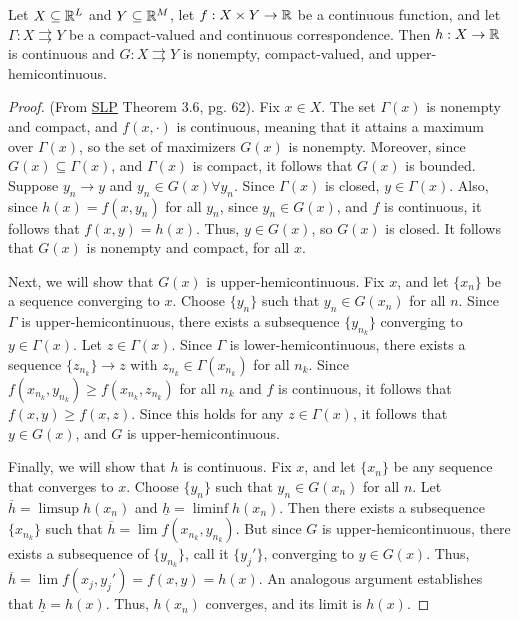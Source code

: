 \documentclass[10pt]{article}
\begin{document}
\begin{theorem}\label{thm:berge_max}
	 Let $X \subseteq \mathbb{R}^L$ and $Y \subseteq \mathbb{R}^M$, let $f: X \times Y \to \mathbb{R}$ be a continuous function, and let $\Gamma: X \rightrightarrows Y$ be a compact-valued and continuous correspondence. Then $h: X \to \mathbb{R}$ is continuous and $G: X \rightrightarrows Y$ is nonempty, compact-valued, and upper-hemicontinuous.
\end{theorem}
\begin{proof}
	(From \href{https://www.hup.harvard.edu/books/9780674750968}{SLP} Theorem 3.6, pg. 62). Fix $x \in X$. The set $\Gamma(x)$ is nonempty and compact, and $f(x,\cdot)$ is continuous, meaning that it attains a maximum over $\Gamma(x)$, so the set of maximizers $G(x)$ is nonempty. Moreover, since $G(x) \subseteq \Gamma(x)$, and $\Gamma(x)$ is compact, it follows that $G(x)$ is bounded. Suppose $y_n \to y$ and $y_n \in G(x) \forall y_n$. Since $\Gamma(x)$ is closed, $y \in \Gamma(x)$. Also, since $h(x) = f(x,y_n)$ for all $y_n$, since $y_n \in G(x)$, and $f$ is continuous, it follows that $f(x,y) = h(x)$. Thus, $y \in G(x)$, so $G(x)$ is closed. It follows that $G(x)$ is nonempty and compact, for all $x$.
	
	Next, we will show that $G(x)$ is upper-hemicontinuous. Fix $x$, and let $\{x_n\}$ be a sequence converging to $x$. Choose $\{y_n\}$ such that $y_n \in G(x_n)$ for all $n$. Since $\Gamma$ is upper-hemicontinuous, there exists a subsequence $\{y_{n_k}\}$ converging to $y \in \Gamma(x)$. Let $z \in \Gamma(x)$. Since $\Gamma$ is lower-hemicontinuous, there exists a sequence $\{z_{n_k}\} \to z$ with $z_{n_k} \in \Gamma(x_{n_k})$ for all $n_k$. Since $f(x_{n_k},y_{n_k}) \ge f(x_{n_k},z_{n_k})$ for all $n_k$ and $f$ is continuous, it follows that $f(x,y) \ge f(x,z)$. Since this holds for any $z \in \Gamma(x)$, it follows that $y \in G(x)$, and $G$ is upper-hemicontinuous.
	
	Finally, we will show that $h$ is continuous. Fix $x$, and let $\{x_n\}$ be any sequence that converges to $x$. Choose $\{y_n\}$ such that $y_n \in G(x_n)$ for all $n$. Let $\overline{h} = \limsup h(x_n)$ and $\underline{h} = \liminf h(x_n)$. Then there exists a subsequence $\{x_{n_k}\}$ such that $\overline{h} = \lim f(x_{n_k},y_{n_k})$. But since $G$ is upper-hemicontinuous, there exists a subsequence of $\{y_{n_k}\}$, call it $\{y_j'\}$, converging to $y \in G(x)$. Thus, $\overline{h} = \lim f(x_j,y_j') = f(x,y) = h(x)$. An analogous argument establishes that $\underline{h} = h(x)$. Thus, $h(x_n)$ converges, and its limit is $h(x)$.
\end{proof}
\end{document}
